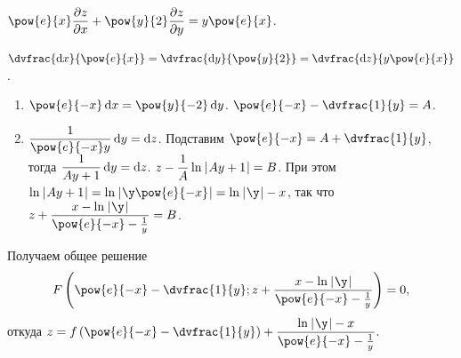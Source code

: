 \documentclass[a5paper,10pt]{article}
\begin{document}
    $\pow{e}{x} \parder{z} {x} + \pow{y}{2} \parder{z} {y} = y \pow{e}{x}$.

    $\dvfrac {\di x} {\pow{e}{x}} = \dvfrac {\di y} {\pow{y}{2}} = \dvfrac {\di z} {y \pow{e}{x}}$.

    \begin{enumerate}
        \item $\pow{e}{-x} \di x = \pow{y}{-2} \di y$.
        $\pow{e}{-x} - \dvfrac{1}{y} = A$.

        \item $\dfrac {1} {\pow{e}{-x} y} \di y = \di z$.
        Подставим $\pow{e}{-x} = A + \dvfrac{1}{y}$, тогда
        $\dfrac {1} {Ay + 1} \di y = \di z$.
        $z - \dfrac{1}{A} \ln\hspace{0.2mm}\left|\hspace{0.06em}Ay + 1\hspace{0.06em}\right| = B$.
        При этом $\ln\vbr{Ay + 1} = \ln\vbr{\y\pow{e}{-x}} = \ln\vbr{\y} - x$,
        так что 
        $z + \dfrac {x - \ln\vbr{\y}} {\pow{e}{-x} - \frac{1}{y}} = B$.
    \end{enumerate}
    Получаем общее решение
    $$F\br{
        \pow{e}{-x} - \dvfrac{1}{y};
        z + \dfrac {x - \ln\vbr{\y}} {\pow{e}{-x} - \frac{1}{y}}}
    = 0,$$
    откуда 
    $z = f\br{\pow{e}{-x} - \dvfrac{1}{y}} 
        + \dfrac {\ln\vbr{\y} - x} {\pow{e}{-x} - \frac{1}{y}}.$
\end{document}
